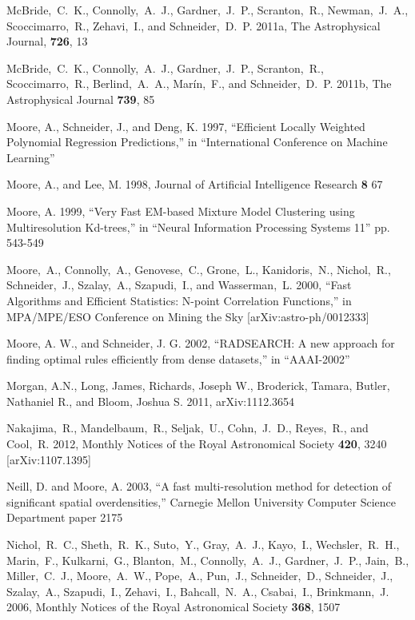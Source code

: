 \documentclass[prd,nofootbib,floatfix,11pt,tightenlines]{revtex4}
\begin{document}
\begin{thebibliography}{99}
McBride,~C.~K., Connolly,~A.~J., Gardner,~J.~P., Scranton,~R., Newman,~J.~A.,
Scoccimarro,~R., Zehavi,~I., and Schneider,~D.~P. 2011a, The Astrophysical
Journal, {\bf 726}, 13

McBride,~C.~K., Connolly,~A.~J., Gardner,~J.~P., Scranton,~R., Scoccimarro,~R.,
Berlind,~A.~A., Mar\'in,~F., and Schneider,~D.~P. 2011b, The Astrophysical
Journal {\bf 739}, 85

Moore, A., Schneider, J., and Deng, K. 1997,
``Efficient Locally Weighted Polynomial Regression Predictions,'' in
``International Conference on Machine Learning''

Moore, A., and Lee, M. 1998, Journal of Artificial Intelligence Research {\bf 8} 67

Moore, A. 1999, ``Very Fast EM-based Mixture Model Clustering using Multiresolution
Kd-trees,'' in ``Neural Information Processing Systems 11''  pp. 543-549

Moore,~A., Connolly,~A., Genovese,~C., Grone,~L., Kanidoris,~N., Nichol,~R.,
Schneider,~J., Szalay,~A., Szapudi,~I., and Wasserman,~L. 2000,
``Fast Algorithms and Efficient Statistics: N-point Correlation Functions,'' in
MPA/MPE/ESO Conference on Mining the Sky [arXiv:astro-ph/0012333]

Moore, A. W., and Schneider, J. G. 2002, 
``RADSEARCH: A new approach for finding optimal rules
efficiently from dense datasets,'' in ``AAAI-2002''

Morgan, A.N., Long, James, Richards, Joseph W., Broderick, Tamara, Butler,
Nathaniel R., and Bloom, Joshua S. 2011, arXiv:1112.3654

Nakajima,~R., Mandelbaum,~R., Seljak,~U., Cohn,~J.~D., Reyes,~R., and
Cool,~R. 2012, Monthly Notices of the Royal Astronomical Society {\bf 420}, 3240
[arXiv:1107.1395]

Neill, D. and Moore, A. 2003,
``A fast multi-resolution method for detection of significant spatial overdensities,''
Carnegie Mellon University Computer Science Department paper 2175

Nichol,~R.~C., Sheth,~R.~K., Suto,~Y., Gray,~A.~J., Kayo,~I., Wechsler,~R.~H.,
Marin,~F., Kulkarni,~G., Blanton,~M., Connolly,~A.~J., Gardner,~J.~P., Jain,~B.,
Miller,~C.~J., Moore,~A.~W., Pope,~A., Pun,~J., Schneider,~D., Schneider,~J.,
Szalay,~A., Szapudi,~I., Zehavi,~I., Bahcall,~N.~A., Csabai,~I., Brinkmann,~J.
2006, Monthly Notices of the Royal Astronomical Society {\bf 368}, 1507


\end{thebibliography}
\end{document}
